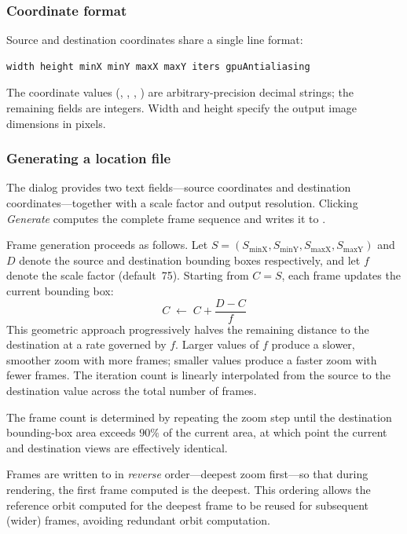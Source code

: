 \subsubsection*{Coordinate format}

Source and destination coordinates share a single line format:

\begin{lstlisting}
width height minX minY maxX maxY iters gpuAntialiasing
\end{lstlisting}

\noindent
The coordinate values (, , ,
) are arbitrary-precision decimal strings; the remaining
fields are integers.  Width and height specify the output image
dimensions in pixels.

\subsubsection*{Generating a location file}

The dialog provides two text fields---source coordinates and
destination coordinates---together with a scale factor and output
resolution.  Clicking \emph{Generate} computes the complete frame
sequence and writes it to .

Frame generation proceeds as follows.  Let $S = (S_\mathrm{minX},
S_\mathrm{minY}, S_\mathrm{maxX}, S_\mathrm{maxY})$ and $D$
denote the source and destination bounding boxes respectively, and
let $f$ denote the scale factor (default~75).  Starting from $C = S$,
each frame updates the current bounding box:
\[
  C \;\leftarrow\; C + \frac{D - C}{f}
\]
This geometric approach progressively halves the remaining distance
to the destination at a rate governed by $f$.  Larger values of $f$
produce a slower, smoother zoom with more frames; smaller values
produce a faster zoom with fewer frames.  The iteration count is
linearly interpolated from the source to the destination value
across the total number of frames.

The frame count is determined by repeating the zoom step until the
destination bounding-box area exceeds $90\%$ of the current area,
at which point the current and destination views are effectively
identical.

Frames are written to  in \emph{reverse}
order---deepest zoom first---so that during rendering, the first
frame computed is the deepest.  This ordering allows the reference
orbit computed for the deepest frame to be reused for subsequent
(wider) frames, avoiding redundant orbit computation.

